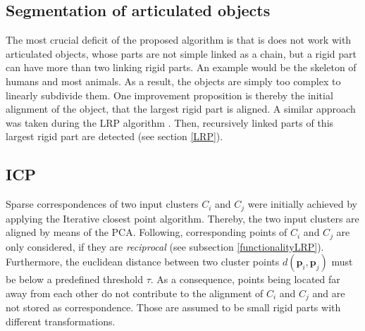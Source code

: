 \subsection{Segmentation of articulated objects}
The most crucial deficit  of the proposed algorithm is that is does not work with articulated objects, whose parts are not simple linked as a chain, but a rigid part can have more than two linking rigid parts. An example would be the skeleton of humans and most animals. As a result, the objects are simply too complex to linearly subdivide them. One improvement proposition is thereby the initial alignment of the object, that the largest rigid part is aligned.  A similar approach was taken during the LRP algorithm \cite{guo2016correspondence}. Then, recursively linked parts of this largest rigid part are detected (see section \ref{LRP}).

\subsection{ICP}
Sparse correspondences of two input clusters $C_i$ and $C_j$ were initially achieved by applying the Iterative closest point algorithm. Thereby, the two input clusters are aligned by means of the PCA. Following, corresponding points of $C_i$ and $C_j$ are only considered, if they are \textit{reciprocal} (see subsection \ref{functionalityLRP}). Furthermore, the euclidean distance between two cluster points $d(\boldsymbol{p}_i,\boldsymbol{p}_j)$ must be below a predefined threshold $\tau$. As a consequence, points being located far away from each other do not contribute to the alignment of $C_i$ and $C_j$ and are not stored as correspondence. Those are assumed to be small rigid parts with different transformations.
